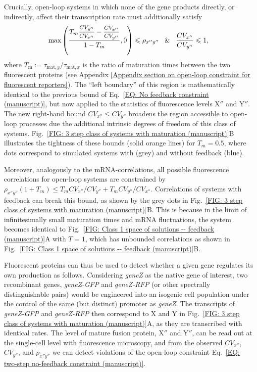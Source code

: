 \documentclass[%
 reprint,prx,
superscriptaddress,
%
%
%
%
%
%
%
%
%
 amsmath,amssymb,
 aps,
%
%
%
%
%
%
]{revtex4-2}
\begin{document}
Crucially, open-loop systems in which none of the gene products directly, or indirectly, affect their transcription rate must additionally satisfy
\begin{equation}
\text{max}\left(\frac{T_{m}\mfrac{CV_{y''}}{CV_{x''}} - \mfrac{CV_{x''}}{CV_{y''}}}{1-T_m},0\right)  \leqslant  \rho_{x''y''}
 \hspace{.8em}\text{\&}\hspace{.86em}\frac{CV_{x''}}{CV_{y''}} \leqslant 1 ,
\label{EQ: two-step no-feedback constraint (manuscript)}
\end{equation}
where $T_\mathrm{m} := \tau_{\mathrm{mat},y} / \tau_{\mathrm{mat},x}$ is the ratio of maturation times between the two fluorescent proteins (see Appendix \ref{Appendix section on open-loop constraint for fluorescent reporters}).
The ``left boundary'' of this region is mathematically identical to the previous bound of Eq.~\eqref{EQ: No feedback constraint (manuscript)}, but now applied to the statistics of fluorescence levels X$''$ and Y$''$. The new right-hand bound $CV_{x''}\leqslant CV_{y''}$ broadens the region accessible to open-loop processes due the additional intrinsic degrees of freedom of this class of systems. {Fig.~\ref{FIG: 3 step class of systems with maturation (manuscript)}B illustrates the tightness of these bounds (solid orange lines) for $T_m = 0.5$, where dots correspond to simulated systems with (grey) and without feedback (blue).} 

Moreover,  analogously to the mRNA-correlations, all possible fluorescence correlations {for open-loop systems} are constrained by $\rho_{x''y''} (1+T_{m}) \leqslant T_{m} CV_{x''}/CV_{y''}  + T_{m}CV_{y''}/CV_{x''}$. {Correlations of systems with feedback can break this bound, as shown by the grey dots in Fig.~\ref{FIG: 3 step class of systems with maturation (manuscript)}B. This is because in the limit of infinitesimally small maturation times and mRNA fluctuations, the system becomes identical to Fig.~\ref{FIG: Class 1 space of solutions -- feedback (manuscript)}A with $T = 1$, which has unbounded correlations as shown in Fig.~\ref{FIG: Class 1 space of solutions -- feedback (manuscript)}B.}  

Fluorescent proteins can thus be {used} to detect whether a given gene regulates its own production as follows. Considering \emph{geneZ} as the native gene of interest, two recombinant genes, \emph{geneZ-GFP}  and \emph{geneZ-RFP} (or other spectrally distinguishable pairs) would be engineered into an isogenic cell population under the control of the same (but distinct) promoter as \emph{geneZ}. The transcripts of \emph{geneZ-GFP} and \emph{geneZ-RFP} then correspond to X and Y in Fig.~\ref{FIG: 3 step class of systems with maturation (manuscript)}A, as they are transcribed with identical rates. The level of mature fusion protein, X$''$ and Y$''$, can be read out at the single-cell level with fluorescence microscopy, and from the observed $CV_{x''}$, $CV_{y''}$, and $\rho_{x''y''}$ we can detect violations of the open-loop constraint Eq.~\eqref{EQ: two-step no-feedback constraint (manuscript)}.
\end{document}
